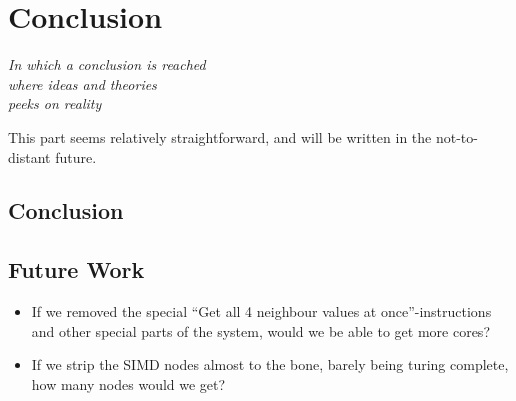 \chapter{Conclusion}\label{ch:conc}

\begin{flushright}{\slshape
    In which a conclusion is reached\\
    where ideas and theories\\
    peeks on reality
}
\end{flushright}

This part seems relatively straightforward, and will be written in the
not-to-distant future.

\section{Conclusion}

\section{Future Work}

\begin{itemize}
\item If we removed the special ``Get all 4 neighbour values at
  once''-instructions and other special parts of the system, would we be able to
  get more cores?
\item If we strip the \ac{SIMD} nodes almost to the bone, barely being turing
  complete, how many nodes would we get?
\end{itemize}
